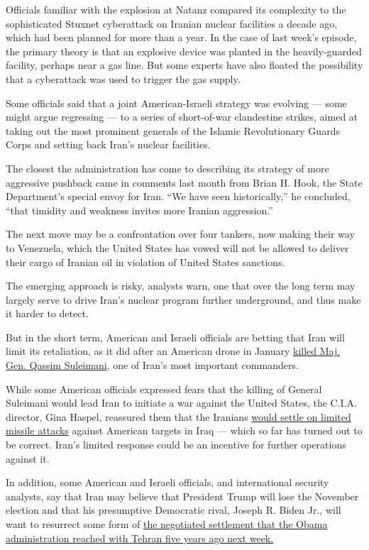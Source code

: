 Officials familiar with the explosion at Natanz compared its complexity
to the sophisticated Stuxnet cyberattack on Iranian nuclear facilities a
decade ago, which had been planned for more than a year. In the case of
last week's episode, the primary theory is that an explosive device was
planted in the heavily-guarded facility, perhaps near a gas line. But
some experts have also floated the possibility that a cyberattack was
used to trigger the gas supply.

Some officials said that a joint American-Israeli strategy was evolving
--- some might argue regressing --- to a series of short-of-war
clandestine strikes, aimed at taking out the most prominent generals of
the Islamic Revolutionary Guards Corps and setting back Iran's nuclear
facilities.

The closest the administration has come to describing its strategy of
more aggressive pushback came in comments last month from Brian H. Hook,
the State Department's special envoy for Iran. ``We have seen
historically,'' he concluded, ``that timidity and weakness invites more
Iranian aggression.''

The next move may be a confrontation over four tankers, now making their
way to Venezuela, which the United States has vowed will not be allowed
to deliver their cargo of Iranian oil in violation of United States
sanctions.

The emerging approach is risky, analysts warn, one that over the long
term may largely serve to drive Iran's nuclear program further
underground, and thus make it harder to detect.

But in the short term, American and Israeli officials are betting that
Iran will limit its retaliation, as it did after an American drone in
January
\href{https://www.nytimes.com/2020/01/11/us/politics/iran-trump.html}{killed
Maj. Gen. Qassim Suleimani}, one of Iran's most important commanders.

While some American officials expressed fears that the killing of
General Suleimani would lead Iran to initiate a war against the United
States, the C.I.A. director, Gina Haspel, reassured them that the
Iranians
\href{https://www.nytimes.com/2020/01/11/us/politics/iran-trump.html}{would
settle on limited missile attacks} against American targets in Iraq ---
which so far has turned out to be correct. Iran's limited response could
be an incentive for further operations against it.

In addition, some American and Israeli officials, and international
security analysts, say that Iran may believe that President Trump will
lose the November election and that his presumptive Democratic rival,
Joseph R. Biden Jr., will want to resurrect some form of
\href{https://www.nytimes.com/2015/07/15/world/middleeast/iran-nuclear-deal-is-reached-after-long-negotiations.html}{the
negotiated settlement that the Obama administration reached with Tehran
five years ago next week.}

